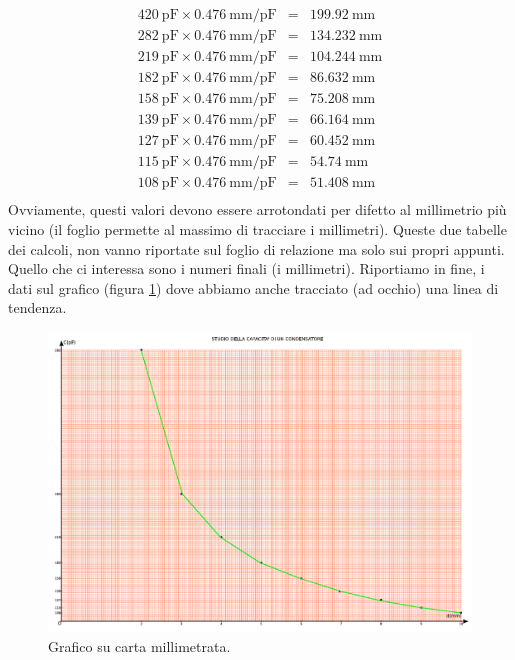 \documentclass[12pt,a4paper,oneside]{book}
\theoremstyle{esercizio}
\begin{document}
\[
\begin{array}{rcl}
\SI{420}{\pico\farad} \times \SI{0.476}{\milli\meter\per\pico\farad} &=& \SI{199.92}{\milli\meter} \\
\SI{282}{\pico\farad} \times \SI{0.476}{\milli\meter\per\pico\farad} &=& \SI{134.232}{\milli\meter} \\
\SI{219}{\pico\farad} \times \SI{0.476}{\milli\meter\per\pico\farad} &=& \SI{104.244}{\milli\meter} \\
\SI{182}{\pico\farad} \times \SI{0.476}{\milli\meter\per\pico\farad} &=& \SI{86.632}{\milli\meter} \\
\SI{158}{\pico\farad} \times \SI{0.476}{\milli\meter\per\pico\farad} &=& \SI{75.208}{\milli\meter} \\
\SI{139}{\pico\farad} \times \SI{0.476}{\milli\meter\per\pico\farad} &=& \SI{66.164}{\milli\meter} \\
\SI{127}{\pico\farad} \times \SI{0.476}{\milli\meter\per\pico\farad} &=& \SI{60.452}{\milli\meter} \\
\SI{115}{\pico\farad} \times \SI{0.476}{\milli\meter\per\pico\farad} &=& \SI{54.74}{\milli\meter} \\
\SI{108}{\pico\farad} \times \SI{0.476}{\milli\meter\per\pico\farad} &=& \SI{51.408}{\milli\meter} \\
\end{array}
\]
Ovviamente, questi valori devono essere arrotondati per difetto al millimetrio più vicino (il foglio permette al massimo di tracciare i millimetri). Queste due tabelle dei calcoli, non vanno riportate sul foglio di relazione ma solo sui propri appunti. Quello che ci interessa sono i numeri finali (i millimetri). Riportiamo in fine, i dati sul grafico (figura \ref{fig:graficomanuale}) dove abbiamo anche tracciato (ad occhio) una linea di tendenza. 
 
    \begin{figure}[h!]
    \centering
    \includegraphics[width=\linewidth]{img/graficomanuale.pdf} 
    \caption{Grafico su carta millimetrata.}
    \label{fig:graficomanuale}
\end{figure} 
\end{document}
